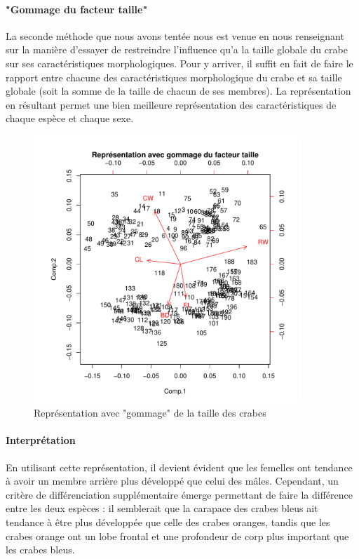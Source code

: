 \documentclass{report}
\begin{document}
\paragraph{"Gommage du facteur taille"}
La seconde méthode que nous avons tentée nous est venue en nous renseignant sur la manière d'essayer de restreindre l'influence qu'a la taille globale du crabe sur ses caractéristiques morphologiques. Pour y arriver, il suffit en fait de faire le rapport entre chacune des caractéristiques morphologique du crabe et sa taille globale (soit la somme de la taille de chacun de ses membres). La représentation en résultant permet une bien meilleure représentation des caractéristiques de chaque espèce et chaque sexe.
\begin{figure}[h!]
\begin{center}
    \includegraphics[width=0.9\textwidth]{newcrabs.pdf}
    \caption{Représentation avec "gommage" de la taille des crabes}
\end{center}
\end{figure}
\paragraph{Interprétation}
En utilisant cette représentation, il devient évident que les femelles ont tendance à avoir un membre arrière plus développé que celui des mâles. Cependant, un critère de différenciation supplémentaire émerge permettant de faire la différence entre les deux espèces : il semblerait que la carapace des crabes bleus ait tendance à être plus développée que celle des crabes oranges, tandis que les crabes orange ont un lobe frontal et une profondeur de corp plus important que les crabes bleus.
\end{document}
